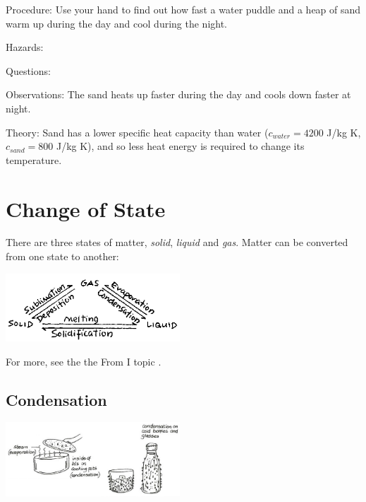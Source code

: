 \begin{multicols}{2}
\begin{description*}
\item[Procedure:]{Use your hand to find out how fast a water puddle and a heap of sand warm up during the day and cool during the night.}
\item[Hazards:]{}
\item[Questions:]{}
\item[Observations:]{The sand heats up faster during the day and cools down faster at night.}
\item[Theory:]{Sand has a lower specific heat capacity than water ($c_{water} = 4200$ J/kg K, $c_{sand} = 800$ J/kg K), and so less heat energy is required to change its temperature.}
\end{description*}


\section*{Change of State}

There are three states of matter, \emph{solid}, \emph{liquid} and \emph{gas}. Matter can be converted from one state to another:

\begin{center}
\includegraphics[width=0.49\textwidth]{./img/source/change-of-state.png}
\end{center}

For more, see the the From I topic .

\subsection{Condensation}

\begin{center}
\includegraphics[width=0.49\textwidth]{./img/vso/condensation.png}
\end{center}


\end{multicols}
